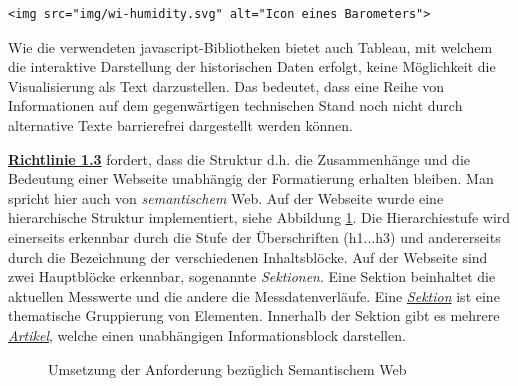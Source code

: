 \begin{lstlisting}[label=lst:altImg,caption=Alternativtext für Icons, language=HTML5, style=htmlcssjs]
<img src="img/wi-humidity.svg" alt="Icon eines Barometers">
\end{lstlisting}

\noindent
Wie die verwendeten javascript-Bibliotheken bietet auch Tableau, mit welchem die interaktive Darstellung der historischen Daten erfolgt, keine Möglichkeit die Visualisierung als Text darzustellen. Das bedeutet, dass eine Reihe von Informationen auf dem gegenwärtigen technischen Stand noch nicht durch alternative Texte barrierefrei dargestellt werden können. \newline

\noindent
\href{https://www.w3.org/Translations/WCAG20-de/#text-equiv}{\textbf{Richtlinie 1.3}} fordert, dass die Struktur d.h. die Zusammenhänge und die Bedeutung einer Webseite unabhängig der Formatierung erhalten bleiben. Man spricht hier auch von \textit{semantischem} Web. Auf der Webseite wurde eine hierarchische Struktur implementiert, siehe Abbildung \ref{img:semWeb}. Die Hierarchiestufe wird einerseits erkennbar durch die Stufe der Überschriften (h1...h3) und andererseits durch die Bezeichnung der verschiedenen Inhaltsblöcke. Auf der Webseite sind zwei Hauptblöcke erkennbar, sogenannte \textit{Sektionen}. Eine Sektion beinhaltet die aktuellen Messwerte und die andere die Messdatenverläufe. Eine \href{https://www.w3.org/TR/2011/WD-html5-20110525/sections.html#the-section-element}{\textit{Sektion}} ist eine thematische Gruppierung von Elementen. Innerhalb der Sektion gibt es mehrere \href{https://www.w3.org/TR/2011/WD-html5-20110525/sections.html#the-article-element}{\textit{Artikel}}, welche einen unabhängigen Informationsblock darstellen.

\begin{figure}[h!]
	\centering
	\caption{Umsetzung der Anforderung bezüglich Semantischem Web}
	\label{img:semWeb}
\end{figure}

